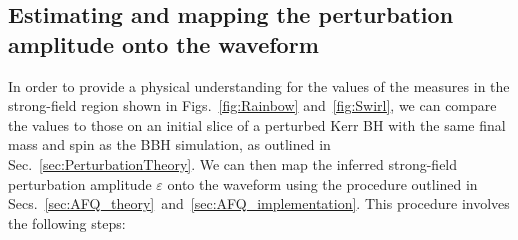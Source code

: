 
\subsection{Estimating and mapping the perturbation amplitude onto the waveform}
\label{sec:PerturbationResults}

\PsiFourComparisonFigureOld

\PsiFourComparisonFigure






In order to provide a physical understanding for the values of the measures in the strong-field region shown in Figs.~\ref{fig:Rainbow} and~\ref{fig:Swirl}, we can compare the values to those on an initial slice of a perturbed Kerr BH with the same final mass and spin as the BBH simulation, as outlined in Sec.~\ref{sec:PerturbationTheory}. We can then map the inferred strong-field perturbation amplitude $\varepsilon$ onto the waveform using the procedure outlined in Secs.~\ref{sec:AFQ_theory}~and~\ref{sec:AFQ_implementation}. This procedure involves the following steps:

